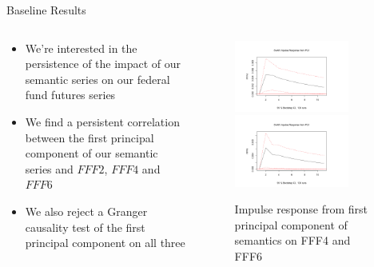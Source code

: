 \documentclass[9pt]{beamer}
\begin{document}
	\begin{frame}{Baseline Results}
		\begin{columns}
			\begin{column}{0.48\textwidth}
				\begin{itemize}
					\item We're interested in the persistence of the impact of our semantic series on our federal fund futures series
					\item We find a persistent correlation between the first principal component of our semantic series and $FFF2$, $FFF4$ and $FFF6$
					\item We also reject a Granger causality test of the first principal component on all three
				\end{itemize}
			\end{column}
			\begin{column}{0.5\textwidth}
				\begin{figure}
					\includegraphics[width=0.8\textwidth]{baselineimpulse4.png}\\
					\includegraphics[width=0.8\textwidth]{baselineimpulse.png}
					\caption{Impulse response from first principal component of semantics on FFF4 and FFF6}
				\end{figure}
			\end{column}
		\end{columns}
	\end{frame}
\end{document}
